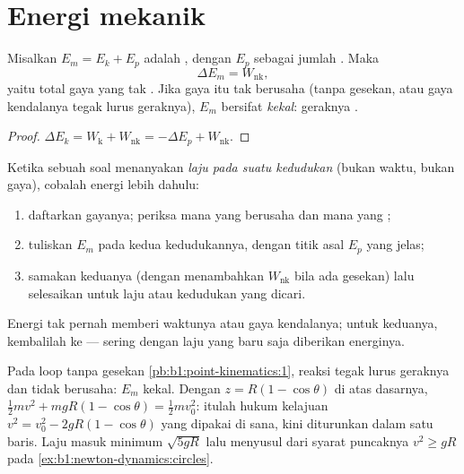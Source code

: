 \section{Energi mekanik}

\begin{theorem}\label{thm:b1:work-and-energy:em}
Misalkan $E_m = E_k + E_p$ adalah \emph{}, dengan $E_p$
sebagai jumlah  . Maka
\[
\Delta E_m = W_{\text{nk}} ,
\]
yaitu  total gaya yang tak . Jika gaya itu tak berusaha
(tanpa gesekan, atau gaya kendalanya tegak lurus geraknya), $E_m$
bersifat \emph{kekal}: geraknya \emph{}.
\end{theorem}

\begin{proof}
$\Delta E_k = W_{\text{k}} + W_{\text{nk}} = -\Delta E_p + W_{\text{nk}}$.
\end{proof}

\begin{method}\label{met:b1:work-and-energy:method}
Ketika sebuah soal menanyakan \emph{laju pada suatu kedudukan} (bukan
waktu, bukan gaya), cobalah energi lebih dahulu:
\begin{enumerate}
  \item daftarkan gayanya; periksa mana yang berusaha dan mana yang
        ;
  \item tuliskan $E_m$ pada kedua kedudukannya, dengan titik asal $E_p$
        yang jelas;
  \item samakan keduanya (dengan menambahkan $W_{\text{nk}}$ bila ada
        gesekan) lalu selesaikan untuk laju atau kedudukan yang dicari.
\end{enumerate}
Energi tak pernah memberi waktunya atau gaya kendalanya; untuk keduanya,
kembalilah ke  --- sering dengan laju yang baru saja
diberikan energinya.
\end{method}

\begin{example}\label{ex:b1:work-and-energy:loop}
Pada loop tanpa gesekan \cref{pb:b1:point-kinematics:1}, reaksi
 tegak lurus geraknya dan tidak berusaha: $E_m$ kekal.
Dengan $z = R(1 - \cos\theta)$ di atas dasarnya, $\tfrac12 mv^2 + mgR(1 -
\cos\theta) = \tfrac12 mv_0^2$: itulah hukum kelajuan $v^2 = v_0^2 - 2gR(1 -
\cos\theta)$ yang dipakai di sana, kini diturunkan dalam satu baris.
Laju masuk minimum $\sqrt{5gR}$ lalu menyusul dari syarat puncaknya
$v^2 \geq gR$ pada \cref{ex:b1:newton-dynamics:circles}.
\end{example}

